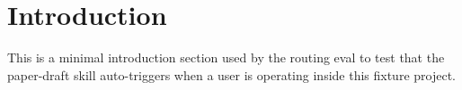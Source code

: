 \section{Introduction}

This is a minimal introduction section used by the routing eval to test that
the paper-draft skill auto-triggers when a user is operating inside this
fixture project.
